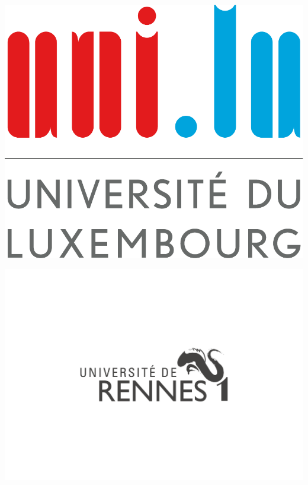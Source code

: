 \documentclass[12pt, twoside]{book}
\begin{document}
\thispagestyle{empty}

\begin{minipage}{0.49\linewidth}
	\noindent
	\includegraphics[scale=.16]{logoul.pdf}
\end{minipage}
\begin{minipage}{0.49\linewidth}
	\noindent
	\includegraphics[width=.33\textwidth, right]{logo-rennes}
\end{minipage}
\end{document}
